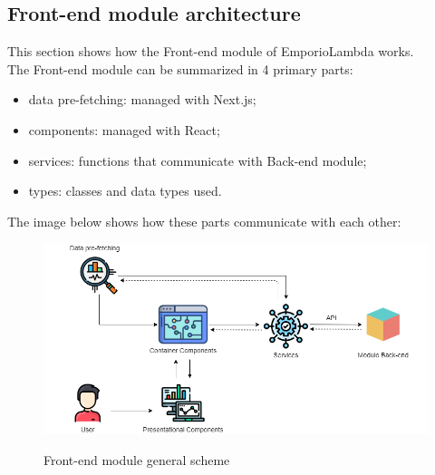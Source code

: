 \subsection{Front-end module architecture}
This section shows how the Front-end module of EmporioLambda works. \\The Front-end module can be summarized in 4 primary parts:
\begin{itemize}
\item data pre-fetching: managed with Next.js;
\item components: managed with React;
\item services: functions that communicate with Back-end module;
\item types: classes and data types used.
\end{itemize} 
The image below shows how these parts communicate with each other:
\begin{figure}[H]
\centering
\includegraphics[scale=0.58]{res/Architettura/Frontend/img/general_frontend}\\
\caption{Front-end module general scheme}
\end{figure}


